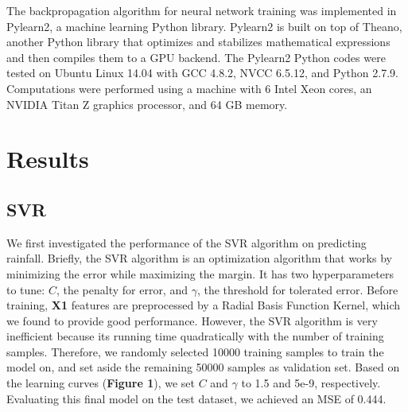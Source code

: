 \documentclass[12pt] {article}
\begin{document}
The backpropagation algorithm for neural network training was implemented in Pylearn2, a machine learning Python library. Pylearn2 is built on top of Theano, another Python library that optimizes and stabilizes mathematical expressions and then compiles them to a GPU backend. The Pylearn2 Python codes were tested on Ubuntu Linux 14.04 with GCC 4.8.2, NVCC 6.5.12, and Python 2.7.9. Computations were performed using a machine with 6 Intel Xeon cores, an NVIDIA Titan Z graphics processor, and 64 GB memory.

\section{Results}
\subsection{SVR}
We first investigated the performance of the SVR algorithm on predicting rainfall. Briefly, the SVR algorithm is an optimization algorithm that works by minimizing the error while maximizing the margin. It has two hyperparameters to tune: $C$, the penalty for error, and $\gamma$, the threshold for tolerated error. Before training, \textbf{X1} features are preprocessed by a Radial Basis Function Kernel, which we found to provide good performance. However, the SVR algorithm is very inefficient because its running time quadratically with the number of training samples. Therefore, we randomly selected 10000 training samples to train the model on, and set aside the remaining 50000 samples as validation set. Based on the learning curves (\textbf{Figure 1}), we set $C$ and $\gamma$ to 1.5 and 5e-9, respectively. Evaluating this final model on the test dataset, we achieved an MSE of 0.444.
\end{document}

